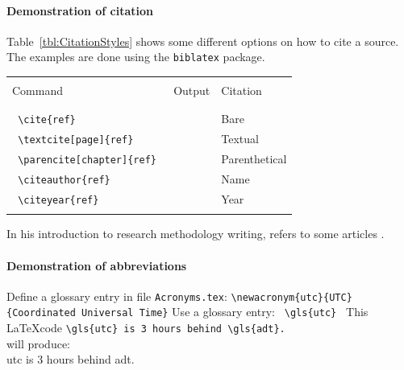 \paragraph{Demonstration of citation}
Table~\ref{tbl:CitationStyles} shows some different options on how to cite a source. 
The examples are done using the \texttt{biblatex} package.
\begin{center}
\begin{minipage}{\columnwidth}%
	\begin{tabular}{lll}
		\hline \\
		Command & 	Output	& Citation \\
		\\
		\hline \\
		\verb! \cite{ref} ! & \cite{Monippally2010} & Bare\\
		\verb! \textcite[page]{ref} ! & \textcite[p. 20]{Monippally2010} & Textual\\
		\verb! \parencite[chapter]{ref} ! & \parencite[chap. 4]{Monippally2010} & Parenthetical\\
		
		\verb! \citeauthor{ref} ! & \citeauthor{Monippally2010} & Name\\
		\verb! \citeyear{ref} ! & \citeyear{Monippally2010} & Year\\
		\hline \\
	\end{tabular}  
\end{minipage}
\end{center}
In his introduction to research methodology writing, \citeauthor{Bouchrika2020} refers to some articles \cite{Bouchrika2020,Choy2014,Holden2004}.

\paragraph{Demonstration of abbreviations}
Define a glossary entry in file \texttt{Acronyms.tex}:
\newline
\verb!\newacronym{utc}{UTC}{Coordinated Universal Time}!
\newline
Use a glossary entry: \verb! \gls{utc} !
\newline
This \LaTeX code \verb*|\gls{utc} is 3 hours behind \gls{adt}.| \\
will produce: \\
\gls{utc} is 3 hours behind \gls{adt}.\\

